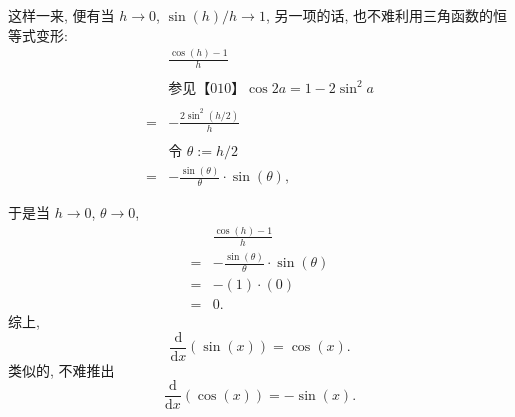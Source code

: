 这样一来, 便有当 \(h\rightarrow0\), \(\sin(h)/h\rightarrow 1\),
另一项的话, 也不难利用三角函数的恒等式变形: \[
\begin{aligned}
&\frac{\cos(h)-1}{h}\\
\\
&\text{参见【010】}\cos2a=1-2\sin^2a\\
\\
=&-\frac{2\sin^2(h/2)}{h}\\
\\
&\text{令 }\theta:=h/2
\\
=&-\frac{\sin(\theta)}{\theta}\cdot\sin(\theta),
\end{aligned}
\]

于是当 \(h\rightarrow0\), \(\theta\rightarrow0\), \[
\begin{aligned}
&\frac{\cos(h)-1}{h}\\
=&-\frac{\sin(\theta)}{\theta}\cdot\sin(\theta)\\
=&-(1)\cdot(0)\\=&0.
\end{aligned}
\] 综上, \[
\boxed{\frac{\mathrm{d}}{\mathrm{d}x}(\sin(x))=\cos(x)}.
\] 类似的, 不难推出 \[
\boxed{\frac{\mathrm{d}}{\mathrm{d}x}(\cos(x))=-\sin(x)}.
\]
